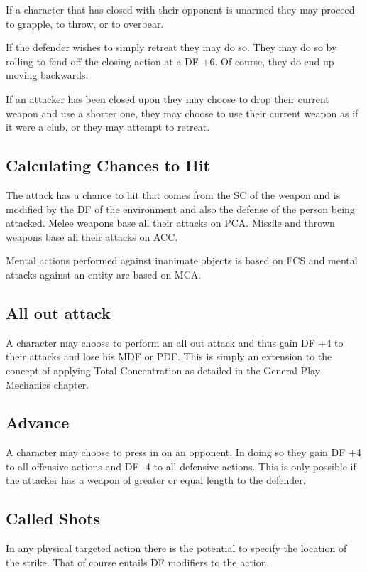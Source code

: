 If a character that has closed with their opponent is unarmed 
they may proceed to grapple, to throw, or to overbear.

If the defender wishes to simply retreat they may do so. They 
may do so by rolling to fend off the closing action at a DF +6. 
Of course, they do end up moving backwards. 

If an attacker has been closed upon they may choose to drop their 
current weapon and use a shorter one, they may choose to use their
current weapon as if it were a club, or they may attempt to retreat.

\subsection{Calculating Chances to Hit}

The attack has a chance to hit that comes from the SC of the weapon and
is modified by the DF of the environment and also the defense of the
person being attacked. Melee 
weapons base all their attacks on PCA. Missile and thrown weapons 
base all their attacks on ACC. 

Mental actions performed against inanimate objects is based on FCS
and mental attacks against an entity are based on MCA.

\subsection{All out attack}

A character may choose to perform an all out attack and thus gain 
DF +4 to their attacks and lose his MDF or PDF. This is simply an
extension to the concept of applying Total Concentration as detailed 
in the General Play Mechanics chapter.

\subsection{Advance} 

A character may choose to press in on an opponent. In doing so 
they gain DF +4 to all offensive actions and DF -4 to all defensive 
actions. This is only possible if the attacker has a weapon of greater 
or equal length to the defender. 

\subsection{Called Shots}
 
In any physical targeted action there is the potential to specify the 
location of the strike. That of course entails DF modifiers to the 
action. 

